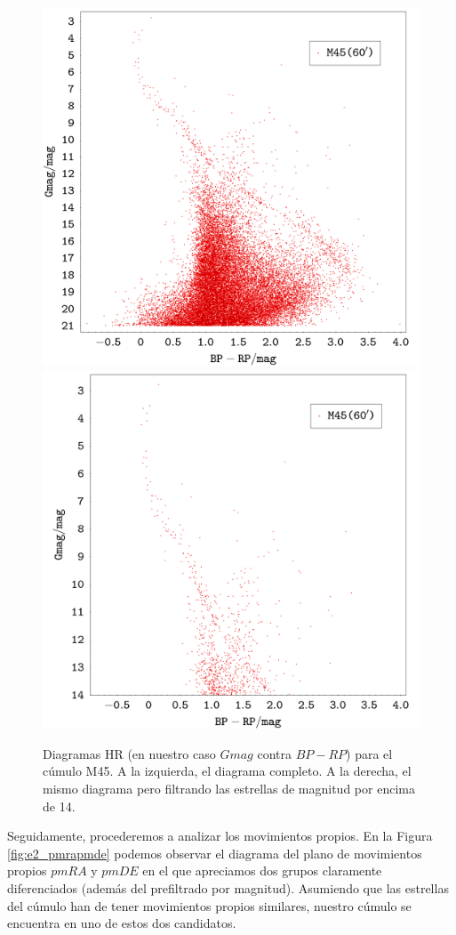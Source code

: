 \documentclass[a4paper,fleqn,usenatbib]{mnras}
\begin{document}
\begin{figure}
  \includegraphics[width=0.49\linewidth]{img/ejercicio2_m45_bprp_gmag}
  \includegraphics[width=0.49\linewidth]{img/ejercicio2_m45_bprp_gmag_14}
  \caption{Diagramas HR (en nuestro caso $Gmag$ contra $BP-RP$) para el cúmulo M45. A la izquierda, el diagrama completo. A la derecha, el mismo diagrama pero filtrando las estrellas de magnitud por encima de 14.}
  \label{fig:e2_bprpgmag}
\end{figure}

Seguidamente, procederemos a analizar los movimientos propios. En la Figura \ref{fig:e2_pmrapmde} podemos observar el diagrama del plano de movimientos propios $pmRA$ y $pmDE$ en el que apreciamos dos grupos claramente diferenciados (además del prefiltrado por magnitud). Asumiendo que las estrellas del cúmulo han de tener movimientos propios similares, nuestro cúmulo se encuentra en uno de estos dos candidatos.
\end{document}
